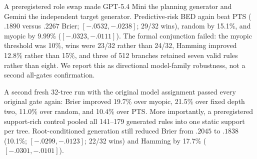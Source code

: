 \documentclass[10pt]{article}
\begin{document}
A preregistered role swap made GPT-5.4 Mini the planning generator and Gemini
the independent target generator. Predictive-risk BED again beat PTS
($.1890$ versus $.2267$ Brier; $[-.0532,-.0238]$; 29/32 wins), random by
15.1\%, and myopic by 9.99\% ($[-.0323,-.0111]$). The formal conjunction
failed: the myopic threshold was 10\%, wins were 23/32 rather than 24/32,
Hamming improved 12.8\% rather than 15\%, and three of 512 branches retained
seven valid rules rather than eight. We report this as directional
model-family robustness, not a second all-gates confirmation.

A second fresh 32-tree run with the original model assignment passed every
original gate again: Brier improved 19.7\% over myopic, 21.5\% over fixed
depth two, 11.0\% over random, and 10.4\% over PTS. More importantly, a
preregistered support-rich control pooled all 141--179 generated rules into
one static support per tree. Root-conditioned generation still reduced Brier
from $.2045$ to $.1838$ (10.1\%; $[-.0299,-.0123]$; 22/32 wins) and Hamming
by 17.7\% ($[-.0301,-.0101]$).
\end{document}
